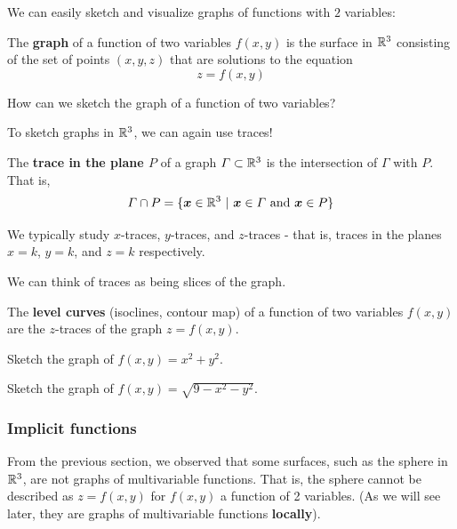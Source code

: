 We can easily sketch and visualize graphs of functions with $2$ variables:

\begin{definition}
    The \textbf{graph} of a function of two variables $f(x,y)$ is the surface in $\mathbb{R}^3$ consisting of the set of points $(x,y,z)$ that are solutions to the equation
    $$z = f(x,y)$$
\end{definition}

\begin{motivating}
How can we sketch the graph of a function of two variables?
\end{motivating}

To sketch graphs in $\mathbb{R}^3$, we can again use traces!

\begin{definition}
    The \textbf{trace in the plane $P$} of a graph $\Gamma \subset \mathbb{R}^3$ is the intersection of $\Gamma$ with $P$.  That is, 
    $$\Gamma \cap P = \{\bm{x} \in \mathbb{R}^3 \ | \ \bm{x} \in \Gamma \ \textnormal{and} \ \bm{x} \in P\}$$
    
    We typically study $x$-traces, $y$-traces, and $z$-traces - that is, traces in the planes $x=k$, $y=k$, and $z=k$ respectively.
    
\end{definition}

We can think of traces as being slices of the graph. 

\begin{definition}
    The \textbf{level curves} (isoclines, contour map) of a function of two variables $f(x,y)$ are the $z$-traces of the graph $z = f(x,y)$.
\end{definition}





\begin{example}
Sketch the graph of $f(x,y) = x^2 + y^2$.
\end{example}

\begin{example}
Sketch the graph of $f(x,y) = \sqrt{9-x^2 - y^2}$.
\end{example}



\subsubsection{Implicit functions}

From the previous section, we observed that some surfaces, such as the sphere in $\mathbb{R}^3$, are not graphs of multivariable functions.  That is, the sphere cannot be described as $z = f(x,y)$ for $f(x,y)$ a function of 2 variables. (As we will see later, they are graphs of multivariable functions \textbf{locally}).


